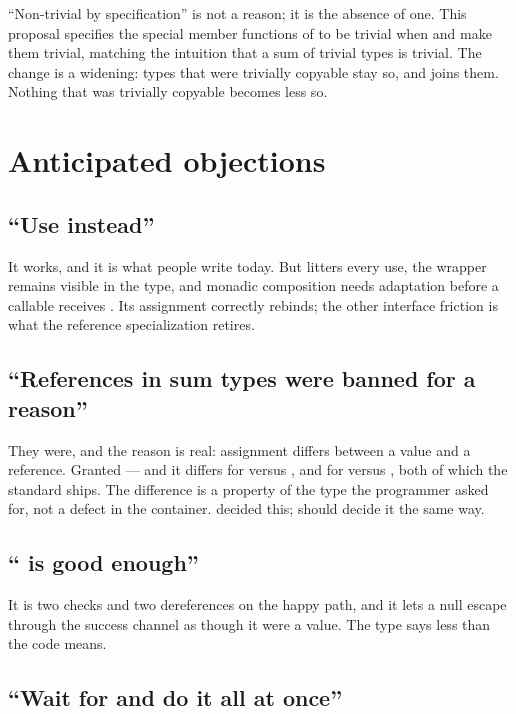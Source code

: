 \documentclass[a4paper,10pt,oneside,openany,final,article]{memoir}
\begin{document}
``Non-trivial by specification'' is not a reason; it is the absence of one. This
proposal specifies the special member functions of  to be trivial
when  and  make them trivial, matching the intuition that a sum
of trivial types is trivial. The change is a widening: types that were trivially
copyable stay so, and  joins them. Nothing that was
trivially copyable becomes less so.

\chapter{Anticipated objections}

\section{``Use  instead''}

It works, and it is what people write today. But  litters every
use, the wrapper remains visible in the type, and monadic composition needs
adaptation before a callable receives . Its assignment correctly
rebinds; the other interface friction is what the reference specialization
retires.

\section{``References in sum types were banned for a reason''}

They were, and the reason is real: assignment differs between a value and a
reference. Granted --- and it differs for  versus , and
for  versus , both of which the standard
ships. The difference is a property of the type the programmer asked for, not a
defect in the container.  decided this; 
should decide it the same way.

\section{`` is good enough''}

It is two checks and two dereferences on the happy path, and it lets a null
 escape through the success channel as though it were a value. The
type says less than the code means.

\section{``Wait for  and do it all at once''}
\end{document}
